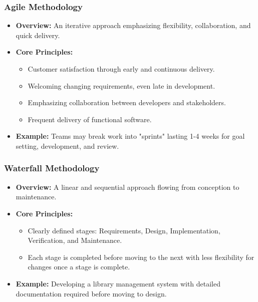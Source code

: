 \documentclass{beamer}
\begin{document}
\begin{frame}[fragile]
    \frametitle{Agile Methodology}
    \begin{itemize}
        \item \textbf{Overview:} An iterative approach emphasizing flexibility, collaboration, and quick delivery.
        \item \textbf{Core Principles:}
        \begin{itemize}
            \item Customer satisfaction through early and continuous delivery.
            \item Welcoming changing requirements, even late in development.
            \item Emphasizing collaboration between developers and stakeholders.
            \item Frequent delivery of functional software.
        \end{itemize}
        \item \textbf{Example:} Teams may break work into "sprints" lasting 1-4 weeks for goal setting, development, and review.
    \end{itemize}
\end{frame}

\begin{frame}[fragile]
    \frametitle{Waterfall Methodology}
    \begin{itemize}
        \item \textbf{Overview:} A linear and sequential approach flowing from conception to maintenance.
        \item \textbf{Core Principles:}
        \begin{itemize}
            \item Clearly defined stages: Requirements, Design, Implementation, Verification, and Maintenance.
            \item Each stage is completed before moving to the next with less flexibility for changes once a stage is complete.
        \end{itemize}
        \item \textbf{Example:} Developing a library management system with detailed documentation required before moving to design.
    \end{itemize}
\end{frame}
\end{document}
